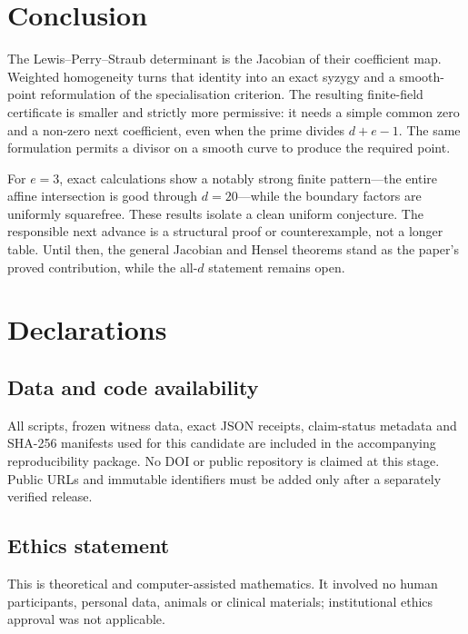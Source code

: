 \documentclass[
]{article}
\begin{document}
\section{Conclusion}\label{conclusion}

The Lewis--Perry--Straub determinant is the Jacobian of their
coefficient map. Weighted homogeneity turns that identity into an exact
syzygy and a smooth-point reformulation of the specialisation criterion.
The resulting finite-field certificate is smaller and strictly more
permissive: it needs a simple common zero and a non-zero next
coefficient, even when the prime divides \(d+e-1\). The same formulation
permits a divisor on a smooth curve to produce the required point.

For \(e=3\), exact calculations show a notably strong finite
pattern---the entire affine intersection is good through
\(d=20\)---while the boundary factors are uniformly squarefree. These
results isolate a clean uniform conjecture. The responsible next advance
is a structural proof or counterexample, not a longer table. Until then,
the general Jacobian and Hensel theorems stand as the paper's proved
contribution, while the all-\(d\) statement remains open.

\section*{Declarations}\label{declarations}

\subsection*{Data and code
availability}\label{data-and-code-availability}

All scripts, frozen witness data, exact JSON receipts, claim-status
metadata and SHA-256 manifests used for this candidate are included in
the accompanying reproducibility package. No DOI or public repository is
claimed at this stage. Public URLs and immutable identifiers must be
added only after a separately verified release.

\subsection*{Ethics statement}\label{ethics-statement}

This is theoretical and computer-assisted mathematics. It involved no
human participants, personal data, animals or clinical materials;
institutional ethics approval was not applicable.
\end{document}
